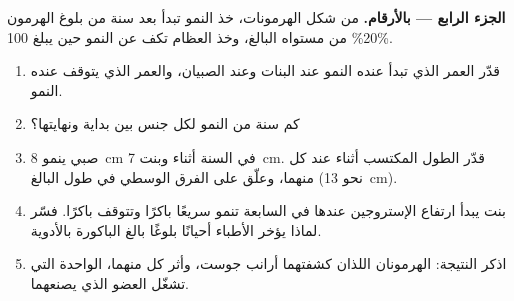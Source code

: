 \begin{problem}
\medskip
\noindent\textbf{الجزء الرابع ---  بالأرقام.}
من شكل الهرمونات، خذ  النمو تبدأ بعد سنة من بلوغ الهرمون 20\% من
مستواه البالغ، وخذ العظام تكف عن النمو حين يبلغ 100\%.
\begin{enumerate}[resume]
  \item قدّر العمر الذي تبدأ عنده  النمو عند البنات وعند الصبيان،
        والعمر الذي يتوقف عنده النمو.
  \item كم سنة من النمو لكل جنس بين بداية  ونهايتها؟
  \item صبي ينمو \qty{8}{cm} في السنة أثناء  وبنت \qty{7}{cm}.
        قدّر الطول المكتسب أثناء  عند كل منهما، وعلّق على الفرق
        الوسطي في طول البالغ (نحو \qty{13}{cm}).
  \item بنت يبدأ ارتفاع الإستروجين عندها في السابعة تنمو سريعًا باكرًا
        وتتوقف باكرًا. فسّر لماذا يؤخر الأطباء أحيانًا بلوغًا بالغ
        الباكورة بالأدوية.
  \item اذكر النتيجة: الهرمونان اللذان كشفتهما أرانب جوست، وأثر كل
        منهما،  الواحدة التي تشغّل العضو الذي يصنعهما.
\end{enumerate}
\end{problem}
